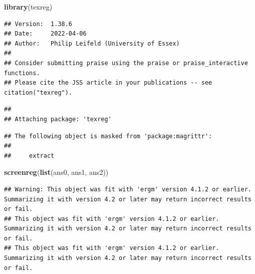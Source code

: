\documentclass[]{book}
\newenvironment{Shaded}{\begin{snugshade}}{\end{snugshade}}
\newcommand{\KeywordTok}[1]{\textcolor[rgb]{0.13,0.29,0.53}{\textbf{#1}}}
\newcommand{\NormalTok}[1]{#1}
\begin{document}
\begin{Shaded}
\begin{Highlighting}[]
\KeywordTok{library}\NormalTok{(texreg)}
\end{Highlighting}
\end{Shaded}

\begin{verbatim}
## Version:  1.38.6
## Date:     2022-04-06
## Author:   Philip Leifeld (University of Essex)
## 
## Consider submitting praise using the praise or praise_interactive functions.
## Please cite the JSS article in your publications -- see citation("texreg").
\end{verbatim}

\begin{verbatim}
## 
## Attaching package: 'texreg'
\end{verbatim}

\begin{verbatim}
## The following object is masked from 'package:magrittr':
## 
##     extract
\end{verbatim}

\begin{Shaded}
\begin{Highlighting}[]
\KeywordTok{screenreg}\NormalTok{(}\KeywordTok{list}\NormalTok{(ans0, ans1, ans2))}
\end{Highlighting}
\end{Shaded}

\begin{verbatim}
## Warning: This object was fit with 'ergm' version 4.1.2 or earlier. Summarizing it with version 4.2 or later may return incorrect results or fail.
## This object was fit with 'ergm' version 4.1.2 or earlier. Summarizing it with version 4.2 or later may return incorrect results or fail.
## This object was fit with 'ergm' version 4.1.2 or earlier. Summarizing it with version 4.2 or later may return incorrect results or fail.
\end{verbatim}
\end{document}

